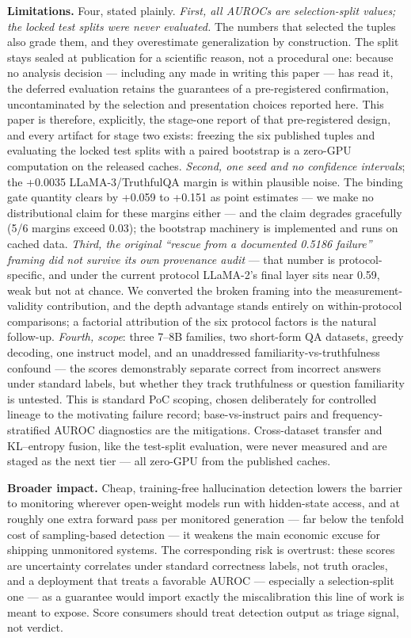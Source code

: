 \textbf{Limitations.} Four, stated plainly. \emph{First, all AUROCs are selection-split values; the locked test splits were never evaluated.} The numbers that selected the tuples also grade them, and they overestimate generalization by construction. The split stays sealed at publication for a scientific reason, not a procedural one: because no analysis decision --- including any made in writing this paper --- has read it, the deferred evaluation retains the guarantees of a pre-registered confirmation, uncontaminated by the selection and presentation choices reported here. This paper is therefore, explicitly, the stage-one report of that pre-registered design, and every artifact for stage two exists: freezing the six published tuples and evaluating the locked test splits with a paired bootstrap is a zero-GPU computation on the released caches. \emph{Second, one seed and no confidence intervals}; the +0.0035 LLaMA-3/TruthfulQA margin is within plausible noise. The binding gate quantity clears by +0.059 to +0.151 as point estimates --- we make no distributional claim for these margins either --- and the claim degrades gracefully (5/6 margins exceed 0.03); the bootstrap machinery is implemented and runs on cached data. \emph{Third, the original ``rescue from a documented 0.5186 failure'' framing did not survive its own provenance audit} --- that number is protocol-specific, and under the current protocol LLaMA-2's final layer sits near 0.59, weak but not at chance. We converted the broken framing into the measurement-validity contribution, and the depth advantage stands entirely on within-protocol comparisons; a factorial attribution of the six protocol factors is the natural follow-up. \emph{Fourth, scope}: three 7--8B families, two short-form QA datasets, greedy decoding, one instruct model, and an unaddressed familiarity-vs-truthfulness confound --- the scores demonstrably separate correct from incorrect answers under standard labels, but whether they track truthfulness or question familiarity is untested. This is standard PoC scoping, chosen deliberately for controlled lineage to the motivating failure record; base-vs-instruct pairs and frequency-stratified AUROC diagnostics are the mitigations. Cross-dataset transfer and KL--entropy fusion, like the test-split evaluation, were never measured and are staged as the next tier --- all zero-GPU from the published caches.

\textbf{Broader impact.} Cheap, training-free hallucination detection lowers the barrier to monitoring wherever open-weight models run with hidden-state access, and at roughly one extra forward pass per monitored generation --- far below the tenfold cost of sampling-based detection --- it weakens the main economic excuse for shipping unmonitored systems. The corresponding risk is overtrust: these scores are uncertainty correlates under standard correctness labels, not truth oracles, and a deployment that treats a favorable AUROC --- especially a selection-split one --- as a guarantee would import exactly the miscalibration this line of work is meant to expose. Score consumers should treat detection output as triage signal, not verdict.
